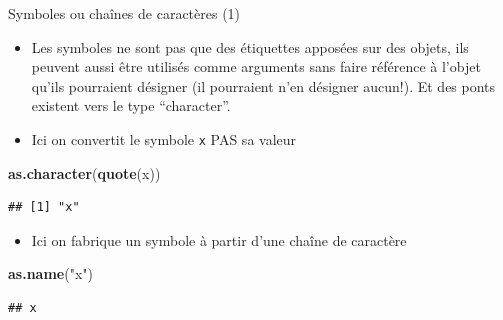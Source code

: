 \documentclass[
  ignorenonframetext,
]{beamer}
\newenvironment{Shaded}{\begin{snugshade}}{\end{snugshade}}
\newcommand{\FunctionTok}[1]{\textcolor[rgb]{0.13,0.29,0.53}{\textbf{#1}}}
\newcommand{\NormalTok}[1]{#1}
\newcommand{\StringTok}[1]{\textcolor[rgb]{0.31,0.60,0.02}{#1}}
\providecommand{\tightlist}{%
  \setlength{\itemsep}{0pt}\setlength{\parskip}{0pt}}
\begin{document}
\begin{frame}[fragile]{Symboles ou chaînes de caractères (1)}
\protect\hypertarget{symboles-ou-chauxeenes-de-caractuxe8res-1}{}
\begin{itemize}
\tightlist
\item
  Les symboles ne sont pas que des étiquettes apposées sur des objets,
  ils peuvent aussi être utilisés comme arguments sans faire référence à
  l'objet qu'ils pourraient désigner (il pourraient n'en désigner
  aucun!). Et des ponts existent vers le type ``character''.
\item
  Ici on convertit le symbole \texttt{x} PAS sa valeur
\end{itemize}

\tiny

\begin{Shaded}
\begin{Highlighting}[]
\FunctionTok{as.character}\NormalTok{(}\FunctionTok{quote}\NormalTok{(x))}
\end{Highlighting}
\end{Shaded}

\begin{verbatim}
## [1] "x"
\end{verbatim}

\normalsize

\begin{itemize}
\tightlist
\item
  Ici on fabrique un symbole à partir d'une chaîne de caractère
\end{itemize}

\tiny

\begin{Shaded}
\begin{Highlighting}[]
\FunctionTok{as.name}\NormalTok{(}\StringTok{"x"}\NormalTok{)}
\end{Highlighting}
\end{Shaded}

\begin{verbatim}
## x
\end{verbatim}

\normalsize
\end{frame}
\end{document}
